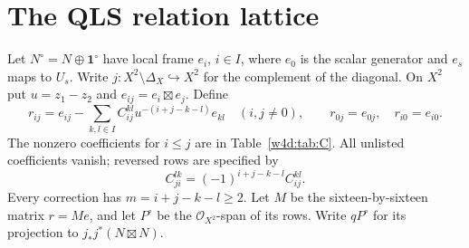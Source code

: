 \section{The QLS relation lattice}\label{w4d:sec:lattice}
Let $N^\circ=N\oplus\mathbf1^\circ$ have local frame $e_i$, $i\in I$, where $e_0$ is the scalar generator and $e_s$ maps to $U_s$. Write $j:X^2\setminus\Delta_X\hookrightarrow X^2$ for the complement of the diagonal. On $X^2$ put $u=z_1-z_2$ and $e_{ij}=e_i\boxtimes e_j$. Define
\begin{equation}\label{w4d:eq:primal-lattice}
 r_{ij}=e_{ij}-\sum_{k,l\in I} C_{ij}^{kl}
                  u^{-(i+j-k-l)}e_{kl}\quad(i,j\ne0),
 \qquad r_{0j}=e_{0j},\quad r_{i0}=e_{i0}.
\end{equation}
The nonzero coefficients for $i\leq j$ are in Table~\ref{w4d:tab:C}. All unlisted coefficients vanish; reversed rows are specified by
\begin{equation}\label{w4d:eq:flip}
 C_{ji}^{lk}=(-1)^{i+j-k-l}C_{ij}^{kl}.
\end{equation}
Every correction has $m=i+j-k-l\geq2$. Let $M$ be the sixteen-by-sixteen matrix $r=Me$, and let $P^\circ$ be the $\mathcal O_{X^2}$-span of its rows. Write $qP^\circ$ for its projection to $j_*j^*(N\boxtimes N)$.
\begingroup\small\renewcommand{\arraystretch}{1.24}
